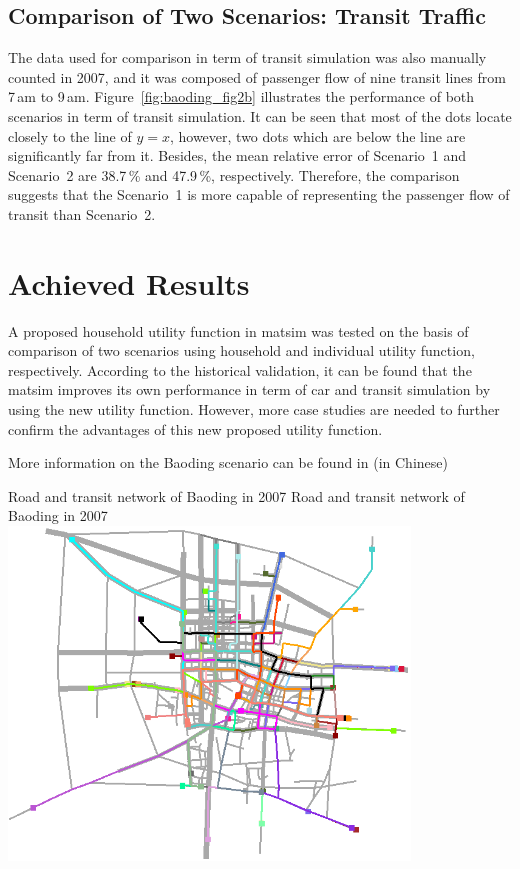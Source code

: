 \subsection{Comparison of Two Scenarios: Transit Traffic}
The data used for comparison in term of transit simulation was also manually counted in 2007, and it was composed of passenger flow of nine transit lines from 7\,am to 9\,am. Figure~\ref{fig:baoding_fig2b} illustrates the performance of both scenarios in term of transit simulation. 
It can be seen that most of the dots locate closely to the line of $y=x$, however, two dots which are below the line are significantly far from it. 
Besides, the mean relative error of Scenario~1 and Scenario~2 are 38.7\,\% and 47.9\,\%, respectively. 
Therefore, the comparison suggests that the Scenario~1 is more capable of representing the passenger flow of transit than Scenario~2. 

\section{Achieved Results}
A proposed household utility function in \gls{matsim} was tested on the basis of comparison of two scenarios using household and individual utility function, respectively. According to the historical validation, it can be found that the \gls{matsim} improves its own performance in term of car and transit simulation by using the new utility function. 
However, more case studies are needed to further confirm the advantages of this new proposed utility function.

More information on the Baoding scenario can be found in \citet[][]{Zhuge_PhDThesis_2014} (in Chinese) 

\createfigure%
{Road and transit network of Baoding in 2007}%
{Road and transit network of Baoding in 2007}%
{\label{fig:baoding_fig1}}%
{\includegraphics[width=0.8\textwidth, angle=0]{scenarios/figures/baoding_fig1.png}}%
{}

